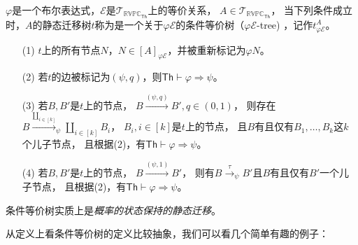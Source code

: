 \begin{definition}[条件等价树]
   $\varphi$是一个布尔表达式，$\mathcal{E}$是$\mathcal{T}_{\mathbb{RVPC}_{\mathsf{Th}}}$上的等价关系，
   $A\in \mathcal{T}_{\mathbb{RVPC}_{\mathsf{Th}}}$，
   当下列条件成立时，$A$的静态迁移树$t$称为是一个关于$\varphi\mathcal{E}$的条件等价树（$\varphi \mathcal{E}$-tree) ，记作$t^A_{\varphi \mathcal{E}}$。
\begin{itemize}
   \item[(1)] $t$上的所有节点$N$，$N\in [A]_{\varphi \mathcal{E}}$，并被重新标记为$\varphi N$。
   \item[(2)] {
   若$t$的边被标记为$(\psi, q)$，则$\mathsf{Th}\vdash \varphi\Rightarrow \psi$。
   }
   \item[(3)] {
         若$B,B'$是$t$上的节点，
         $B\stackrel{(\psi,q)}{\rightarrow}B',q\in (0,1)$，
         则存在$B\stackrel{\coprod_{i\in [k]}}{\longrightarrow}_{\psi} \coprod_{i\in [k]} B_i$，
         $B_i,i\in [k]$是$t$上的节点，
         且$B$有且仅有$B_1,\dots, B_k$这$k$个儿子节点，
         且根据(2)，有$\mathsf{Th}\vdash \varphi\Rightarrow \psi$。
   }
   \item[(4)] {
      若$B,B'$是$t$上的节点，
      $B\stackrel{(\psi,1)}{\rightarrow}B'$，
      则有$B\stackrel{\tau}{\rightarrow}_{\psi}B'$且$B$有且仅有$B'$一个儿子节点，
      且根据(2)，有$\mathsf{Th}\vdash \varphi\Rightarrow \psi$。
   }
\end{itemize}
\end{definition}

条件等价树实质上是\textit{概率的状态保持的静态迁移}。

从定义上看条件等价树的定义比较抽象，我们可以看几个简单有趣的例子：

